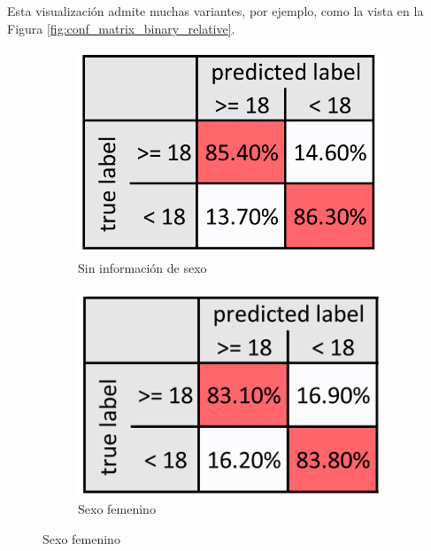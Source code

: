 \begin{itemize}
    Esta visualización admite muchas variantes, por ejemplo, como la vista en la Figura 
    \ref{fig:conf_matrix_binary_relative}.
    
    \begin{figure}[h]
        \centering
    
        \begin{subfigure}[b]{0.3\textwidth}
            \centering
            \includegraphics[width=\textwidth]{capitulos/cap_02/imagenes/confusion_matrix_binary_1.png}
            \caption{Sin información de sexo}
            \label{fig:conf_matrix_general}
        \end{subfigure}
        \hfill
        \begin{subfigure}[b]{0.3\textwidth}
            \centering
            \includegraphics[width=\textwidth]{capitulos/cap_02/imagenes/confusion_matrix_binary_2.png}
            \caption{Sexo femenino}

\end{subfigure}
\end{figure}
\end{itemize}
